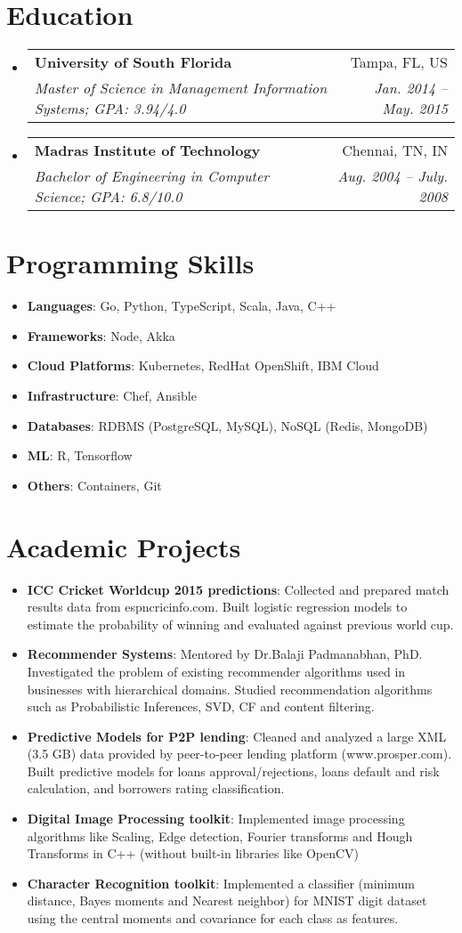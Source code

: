 \documentclass[a4paper,11pt]{article}
\makeatletter
\newcommand{\resumeItem}[2]{
  \item[]\small{
    \textbf{#1}{: #2 \vspace{-2pt}}
  }
}
\newcommand{\resumeSubheading}[4]{
  \vspace{-1pt}\item[]
    \begin{tabular*}{0.97\textwidth}[t]{l@{\extracolsep{\fill}}r}
      \textbf{#1} & #2 \\
      \textit{\small#3} & \textit{\small #4} \\
    \end{tabular*}\vspace{-5pt}
}
\newcommand{\resumeSubItem}[2]{\resumeItem{#1}{#2}\vspace{-4pt}}
\newcommand{\resumeSubHeadingListStart}{\begin{itemize}[leftmargin=*]}
\newcommand{\resumeSubHeadingListEnd}{\end{itemize}}
\makeatother
\begin{document}
\section{Education}
\resumeSubHeadingListStart
\resumeSubheading
{University of South Florida}{Tampa, FL, US}
{Master of Science in Management Information Systems;  GPA: 3.94/4.0}{Jan. 2014 -- May. 2015}
\resumeSubheading
{Madras Institute of Technology}{Chennai, TN, IN}
{Bachelor of Engineering in Computer Science;  GPA: 6.8/10.0}{Aug. 2004 -- July. 2008}
\resumeSubHeadingListEnd

\section{Programming Skills}
\resumeSubHeadingListStart
\resumeSubItem{Languages}
{Go, Python, TypeScript, Scala, Java, C++}
\resumeSubItem{Frameworks}
{Node, Akka}
\resumeSubItem{Cloud Platforms}
{Kubernetes, RedHat OpenShift, IBM Cloud}
\resumeSubItem{Infrastructure}
{Chef, Ansible}
\resumeSubItem{Databases}
{RDBMS (PostgreSQL, MySQL), NoSQL (Redis, MongoDB)}
\resumeSubItem{ML}
{R, Tensorflow}
\resumeSubItem{Others}
{Containers, Git}
\resumeSubHeadingListEnd

\section{Academic Projects}
\resumeSubHeadingListStart
\resumeSubItem{ICC Cricket Worldcup 2015 predictions}
{Collected and prepared match results data from espncricinfo.com.
    Built logistic regression models to estimate the probability of winning and evaluated against previous world cup.}
\resumeSubItem{Recommender Systems}
{Mentored by Dr.Balaji Padmanabhan, PhD. Investigated the problem of existing recommender algorithms used in businesses with hierarchical domains.
    Studied recommendation algorithms such as Probabilistic Inferences, SVD, CF and content filtering.}
\resumeSubItem{Predictive Models for P2P lending}
{Cleaned and analyzed a large XML (3.5 GB) data provided by peer-to-peer lending platform (www.prosper.com).
    Built predictive models for loans approval/rejections, loans default and risk calculation, and borrowers rating classification.}
\resumeSubItem{Digital Image Processing toolkit}
{Implemented image processing algorithms like Scaling, Edge detection, Fourier transforms and Hough Transforms in C++ (without built-in libraries like OpenCV)}
\resumeSubItem{Character Recognition toolkit}
{Implemented a classifier (minimum distance, Bayes moments and Nearest neighbor) for MNIST digit dataset using the central moments and covariance for each class as features.}
\resumeSubHeadingListEnd


\end{document}
